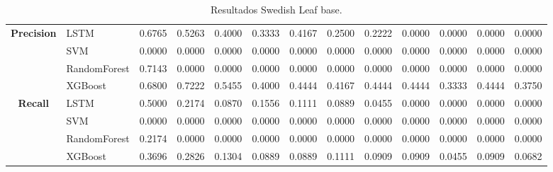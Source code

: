 \begin{table}[h]
\begin{adjustbox}{max width=15cm}
\begin{tabular}{|c|l|r|r|r|r|r|r|r|r|r|r|r|}
		\hline
		\textbf{Precision} & LSTM &  0.6765 &  0.5263 &  0.4000 &  0.3333 &  0.4167 &  0.2500 &  0.2222 &  0.0000 &  0.0000 &  0.0000 &  0.0000 \\
		& SVM &  0.0000 &  0.0000 &  0.0000 &  0.0000 &  0.0000 &  0.0000 &  0.0000 &  0.0000 &  0.0000 &  0.0000 &  0.0000 \\
		& RandomForest &  0.7143 &  0.0000 &  0.0000 &  0.0000 &  0.0000 &  0.0000 &  0.0000 &  0.0000 &  0.0000 &  0.0000 &  0.0000 \\
		& XGBoost &  0.6800 &  0.7222 &  0.5455 &  0.4000 &  0.4444 &  0.4167 &  0.4444 &  0.4444 &  0.3333 &  0.4444 &  0.3750 \\
		\hline
		\textbf{Recall} & LSTM &  0.5000 &  0.2174 &  0.0870 &  0.1556 &  0.1111 &  0.0889 &  0.0455 &  0.0000 &  0.0000 &  0.0000 &  0.0000 \\
		& SVM &  0.0000 &  0.0000 &  0.0000 &  0.0000 &  0.0000 &  0.0000 &  0.0000 &  0.0000 &  0.0000 &  0.0000 &  0.0000 \\
		& RandomForest &  0.2174 &  0.0000 &  0.0000 &  0.0000 &  0.0000 &  0.0000 &  0.0000 &  0.0000 &  0.0000 &  0.0000 &  0.0000 \\
		& XGBoost &  0.3696 &  0.2826 &  0.1304 &  0.0889 &  0.0889 &  0.1111 &  0.0909 &  0.0909 &  0.0455 &  0.0909 &  0.0682 \\
		\hline
	\end{tabular}
\end{adjustbox}
\caption{Resultados Swedish Leaf base.}
\label{tab:SLeaf_base}
\end{table}

